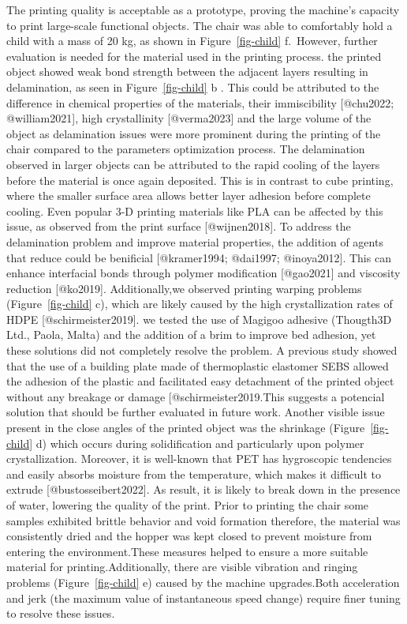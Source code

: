 \documentclass[
  letterpaper,
  DIV=11,
  numbers=noendperiod]{scrartcl}
\begin{document}
The printing quality is acceptable as a prototype, proving the machine's
capacity to print large-scale functional objects. The chair was able to
comfortably hold a child with a mass of 20 kg, as shown in
Figure~\ref{fig-child} f.~However, further evaluation is needed for the
material used in the printing process. the printed object showed weak
bond strength between the adjacent layers resulting in delamination, as
seen in Figure~\ref{fig-child} b . This could be attributed to the
difference in chemical properties of the materials, their immiscibility
{[}@chu2022; @william2021{]}, high crystallinity {[}@verma2023{]} and
the large volume of the object as delamination issues were more
prominent during the printing of the chair compared to the parameters
optimization process. The delamination observed in larger objects can be
attributed to the rapid cooling of the layers before the material is
once again deposited. This is in contrast to cube printing, where the
smaller surface area allows better layer adhesion before complete
cooling. Even popular 3-D printing materials like PLA can be affected by
this issue, as observed from the print surface {[}@wijnen2018{]}. To
address the delamination problem and improve material properties, the
addition of agents that reduce could be benificial {[}@kramer1994;
@dai1997; @inoya2012{]}. This can enhance interfacial bonds through
polymer modification {[}@gao2021{]} and viscosity reduction
{[}@ko2019{]}. Additionally,we observed printing warping problems
(Figure~\ref{fig-child} c), which are likely caused by the high
crystallization rates of HDPE {[}@schirmeister2019{]}. we tested the use
of Magigoo adhesive (Thougth3D Ltd., Paola, Malta) and the addition of a
brim to improve bed adhesion, yet these solutions did not completely
resolve the problem. A previous study showed that the use of a building
plate made of thermoplastic elastomer SEBS allowed the adhesion of the
plastic and facilitated easy detachment of the printed object without
any breakage or damage {[}@schirmeister2019.This suggests a potencial
solution that should be further evaluated in future work. Another
visible issue present in the close angles of the printed object was the
shrinkage (Figure~\ref{fig-child} d) which occurs during solidification
and particularly upon polymer crystallization. Moreover, it is
well-known that PET has hygroscopic tendencies and easily absorbs
moisture from the temperature, which makes it difficult to extrude
{[}@bustosseibert2022{]}. As result, it is likely to break down in the
presence of water, lowering the quality of the print. Prior to printing
the chair some samples exhibited brittle behavior and void formation
therefore, the material was consistently dried and the hopper was kept
closed to prevent moisture from entering the environment.These measures
helped to ensure a more suitable material for printing.Additionally,
there are visible vibration and ringing problems (Figure~\ref{fig-child}
e) caused by the machine upgrades.Both acceleration and jerk (the
maximum value of instantaneous speed change) require finer tuning to
resolve these issues.
\end{document}
